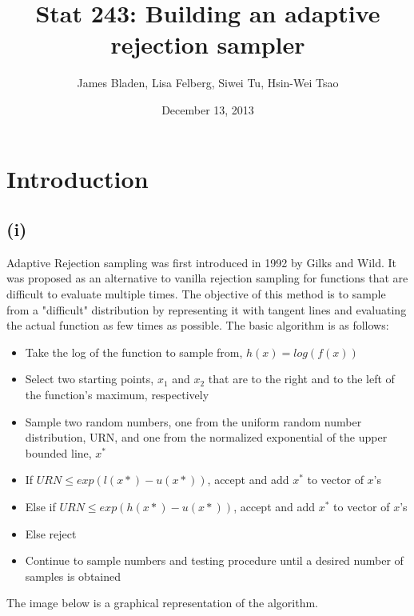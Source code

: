 \documentclass[11pt, oneside]{article}   	%
\title{Stat 243: Building an adaptive rejection sampler}
\author{James Bladen, Lisa Felberg, Siwei Tu, Hsin-Wei Tsao}
\date{December 13, 2013}							%
\begin{document}
\maketitle


\section{Introduction}

\subsection*{ (i) }

Adaptive Rejection sampling was first introduced in 1992 by Gilks and Wild.  It was proposed as an alternative to vanilla rejection sampling for functions that are difficult to evaluate multiple times.  The objective of this method is to sample from a "difficult" distribution by representing it with tangent lines and evaluating the actual function as few times as possible.  The basic algorithm is as follows:

\begin{center}
	\begin{itemize}
		\item{ Take the log of the function to sample from, $h(x) = log(f(x))$ }
		\item{ Select two starting points, $x_1$ and $x_2$ that are to the right and to the left of the function's maximum, respectively}
		\item{ Sample two random numbers, one from the uniform random number distribution, URN, and one from the  normalized exponential of the upper bounded line, $x^*$ }
		\item{ If $URN \le exp(l(x*)-u(x*))$, accept and add $x^*$ to vector of $x$'s }
		\item{ Else if $URN \le exp(h(x*)-u(x*))$, accept and add $x^*$ to vector of $x$'s }
		\item{ Else reject }
		\item{ Continue to sample numbers and testing procedure until a desired number of samples is obtained}
	\end{itemize}
\end{center}

The image below is a graphical representation of the algorithm.
\end{document}
